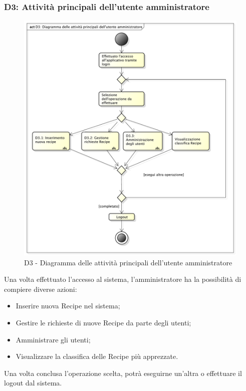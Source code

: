 		\subsubsection{D3: Attività principali dell'utente amministratore} %
		\label{ssub:attivita_principali_dell_utente_amministratore}
		\begin{figure}[!htbp]
			\centering
			\centerline{\includegraphics[scale=0.45]{./images/D3.pdf}}
			\caption{D3 - Diagramma delle attività principali dell'utente amministratore}
		\end{figure}
		\noindent
		Una volta effettuato l'accesso al sistema, l'amministratore ha la possibilità di compiere diverse azioni:
			\begin{itemize}
				\item Inserire nuova Recipe nel sistema;
				\item Gestire le richieste di nuove Recipe da parte degli utenti;
				\item Amministrare gli utenti;
				\item Visualizzare la classifica delle Recipe più apprezzate.
			\end{itemize}
			\noindent
		Una volta conclusa l'operazione scelta, potrà eseguirne un'altra o effettuare il logout dal sistema.

